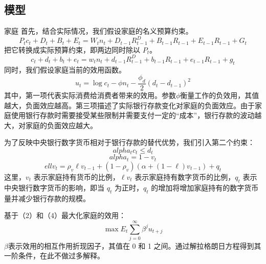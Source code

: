 \documentclass[withoutpreface,bwprint]{cumcmthesis} %
\begin{document}
\subsection{模型}

{\heiti 家庭} 首先，结合实际情况，我们假设家庭的名义预算约束。
\begin{equation}
	P_t c_t+D_t+B_t+E_t=W_t n_t+D_{t-1} R_{t-1}^D+B_{t-1} R_{t-1}+E_{t-1} R_{t-1}+G_t
\end{equation}
把它转换成实际预算约束，即两边同时除以 $P_t$。
\begin{equation}
	c_t+d_t+b_t+e_t=w_t n_t+d_{t-1} R_{t-1}^D+b_{t-1} R_{t-1}+e_{t-1} R_{t-1}+g_t
\end{equation}
同时，我们假设家庭当前的效用函数。
\begin{equation}
	u_t=\log c_t-\phi n_t-\frac{\phi_d}{2}\left(d_t-d_{t-1}\right)^2
\end{equation}
其中，第一项代表实际消费给消费者带来的效用。参数$\phi$衡量工作的负效用，其值越大，负面效应越高。第三项描述了实际银行存款变化对家庭的负面效应。由于家庭使用银行存款时需要接受某些限制并需要支付一定的“成本”，银行存款的波动越大，对家庭的负面效应越大。

为了反映中央银行数字货币相对于银行存款的替代优势，我们引入第二个约束：
\begin{equation}
		alpha_t c_t \leq d_t 
\end{equation}
\begin{equation}
	alpha_t=1-v_t
\end{equation}
\begin{equation}
	ell v_t=\rho_v \ell v_{t-1}+\left(1-\rho_v\right)\left(\alpha+(1-\ell) v_{t-1}\right)+q_t
\end{equation}
这里，$v_t$ 表示家庭持有货币的比例，$\ell v_t$ 表示家庭持有数字货币的比例，$q_t$ 表示中央银行数字货币的影响，即当 $q_t$ 为正时，$q_t$ 的增加将增加家庭持有的数字货币量并减少银行存款的规模。

基于（2）和（4）最大化家庭的效用：
\begin{equation}
	\max E_t \sum_{j=0}^{\infty} \beta^j u_{t+j}
\end{equation}
$β$表示效用的相互作用折现因子，其值在 0 和 1 之间。通过解拉格朗日方程得到其一阶条件，在此不做过多解释。
\end{document}
